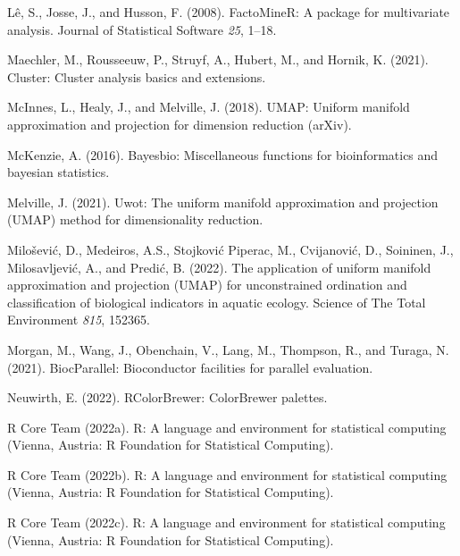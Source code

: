 \documentclass[
  parskip,
  oneside]{scrreprt}
\newlength{\cslhangindent}
\newlength{\cslentryspacingunit} %
\newenvironment{CSLReferences}[2] %
 {%
  \setlength{\parindent}{0pt}
  \ifodd #1
  \let\oldpar\par
  \def\par{\hangindent=\cslhangindent\oldpar}
  \fi
  \setlength{\parskip}{#2\cslentryspacingunit}
 }%
 {}
\begin{document}
\begin{CSLReferences}{0}{0}
\leavevmode{}%
Lê, S., Josse, J., and Husson, F. (2008). {FactoMineR}: A package for
multivariate analysis. Journal of Statistical Software \emph{25}, 1--18.

\leavevmode{}%
Maechler, M., Rousseeuw, P., Struyf, A., Hubert, M., and Hornik, K.
(2021). Cluster: Cluster analysis basics and extensions.

\leavevmode{}%
McInnes, L., Healy, J., and Melville, J. (2018). UMAP: Uniform manifold
approximation and projection for dimension reduction (arXiv).

\leavevmode{}%
McKenzie, A. (2016). Bayesbio: Miscellaneous functions for
bioinformatics and bayesian statistics.

\leavevmode{}%
Melville, J. (2021). Uwot: The uniform manifold approximation and
projection (UMAP) method for dimensionality reduction.

\leavevmode{}%
Milošević, D., Medeiros, A.S., Stojković Piperac, M., Cvijanović, D.,
Soininen, J., Milosavljević, A., and Predić, B. (2022). The application
of uniform manifold approximation and projection (UMAP) for
unconstrained ordination and classification of biological indicators in
aquatic ecology. Science of The Total Environment \emph{815}, 152365.

\leavevmode{}%
Morgan, M., Wang, J., Obenchain, V., Lang, M., Thompson, R., and Turaga,
N. (2021). BiocParallel: Bioconductor facilities for parallel
evaluation.

\leavevmode{}%
Neuwirth, E. (2022). RColorBrewer: ColorBrewer palettes.

\leavevmode{}%
R Core Team (2022a). R: A language and environment for statistical
computing (Vienna, Austria: R Foundation for Statistical Computing).

\leavevmode{}%
R Core Team (2022b). R: A language and environment for statistical
computing (Vienna, Austria: R Foundation for Statistical Computing).

\leavevmode{}%
R Core Team (2022c). R: A language and environment for statistical
computing (Vienna, Austria: R Foundation for Statistical Computing).


\end{CSLReferences}
\end{document}
